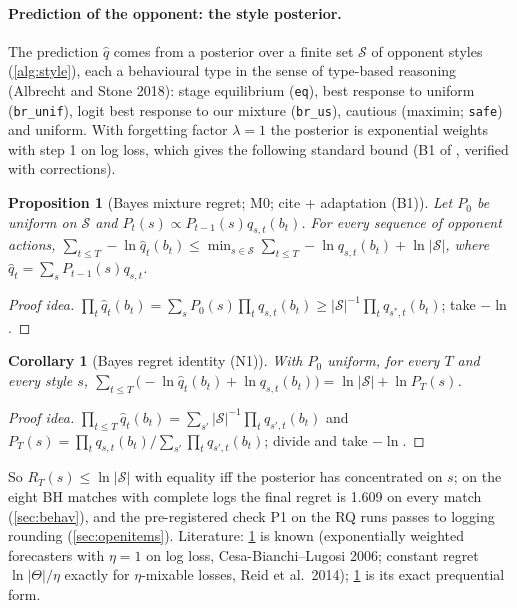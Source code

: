 \documentclass[10pt]{article}
\theoremstyle{plain}
\newtheorem{proposition}[theorem]{Proposition}
\newtheorem{corollary}[theorem]{Corollary}
\theoremstyle{definition}
\theoremstyle{remark}
\newcommand{\qhat}{\hat q}
\newcommand{\src}[1]{\path{#1}}
\begin{document}
\paragraph{Prediction of the opponent: the style posterior.} The prediction $\qhat$ comes from a posterior
over a finite set $\mathcal S$ of opponent styles (\cref{alg:style}), each a behavioural type in the sense of type-based reasoning (Albrecht and Stone 2018): stage equilibrium (\texttt{eq}), best response to uniform (\texttt{br\_unif}), logit best response to our mixture (\texttt{br\_us}), cautious (maximin; \texttt{safe}) and uniform. With forgetting factor $\lambda=1$ the posterior
is exponential weights with step 1 on log loss, which gives the following standard bound (B1 of
\src{theory/experts_extensions.md}, verified with corrections).
\begin{proposition}[Bayes mixture regret; M0; cite + adaptation (B1)]\label{prop:style}
Let $P_0$ be uniform on $\mathcal S$ and $P_t(s)\propto P_{t-1}(s)q_{s,t}(b_t)$. For every sequence of opponent actions,
$\sum_{t\le T}-\ln\qhat_t(b_t)\le\min_{s\in\mathcal S}\sum_{t\le T}-\ln q_{s,t}(b_t)+\ln|\mathcal S|$, where
$\qhat_t=\sum_sP_{t-1}(s)q_{s,t}$.
\end{proposition}
\begin{proof}[Proof idea] $\prod_t\qhat_t(b_t)=\sum_sP_0(s)\prod_tq_{s,t}(b_t)\ge|\mathcal S|^{-1}\prod_tq_{s^*,t}(b_t)$;
take $-\ln$. \end{proof}
\begin{corollary}[Bayes regret identity (N1)]\label{cor:N1}
With $P_0$ uniform, for every $T$ and every style $s$,
$\sum_{t\le T}\big(-\ln\qhat_t(b_t)+\ln q_{s,t}(b_t)\big)=\ln|\mathcal S|+\ln P_T(s)$.
\end{corollary}
\begin{proof}[Proof idea] $\prod_{t\le T}\qhat_t(b_t)=\sum_{s'}|\mathcal S|^{-1}\prod_tq_{s',t}(b_t)$ and
$P_T(s)=\prod_tq_{s,t}(b_t)/\sum_{s'}\prod_tq_{s',t}(b_t)$; divide and take $-\ln$. \end{proof}
So $R_T(s)\le\ln|\mathcal S|$ with equality iff the posterior has concentrated on $s$; on the eight BH matches with complete logs the final
regret is 1.609 on every match (\cref{sec:behav}), and the pre-registered check P1 on the RQ runs passes to logging
rounding (\cref{sec:openitems}). Literature: \cref{prop:style} is known (exponentially weighted forecasters with $\eta=1$
on log loss, Cesa-Bianchi--Lugosi 2006; constant regret $\ln|\Theta|/\eta$ exactly for $\eta$-mixable losses, Reid et
al.\ 2014); \cref{cor:N1} is its exact prequential form.
\end{document}
